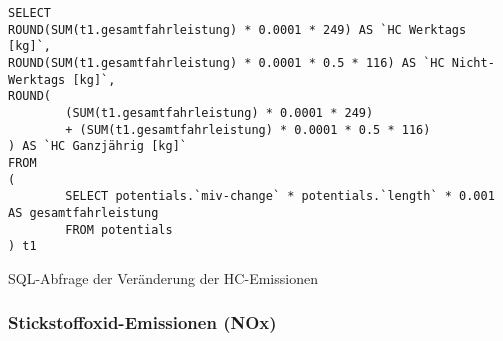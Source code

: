 \documentclass[fontsize=12pt,a4paper]{scrreprt}
\begin{document}
\begin{listing}[htbp]
\begin{verbatim}
SELECT 
ROUND(SUM(t1.gesamtfahrleistung) * 0.0001 * 249) AS `HC Werktags [kg]`, 
ROUND(SUM(t1.gesamtfahrleistung) * 0.0001 * 0.5 * 116) AS `HC Nicht-Werktags [kg]`, 
ROUND(
        (SUM(t1.gesamtfahrleistung) * 0.0001 * 249) 
        + (SUM(t1.gesamtfahrleistung) * 0.0001 * 0.5 * 116)
) AS `HC Ganzjährig [kg]`
FROM
(
        SELECT potentials.`miv-change` * potentials.`length` * 0.001 AS gesamtfahrleistung
        FROM potentials
) t1
\end{verbatim}
\caption{SQL-Abfrage der Veränderung der HC-Emissionen}\label{lst-emmissionen-hc}
\end{listing}

\subsubsection{Stickstoffoxid-Emissionen (NOx)}
\end{document}
